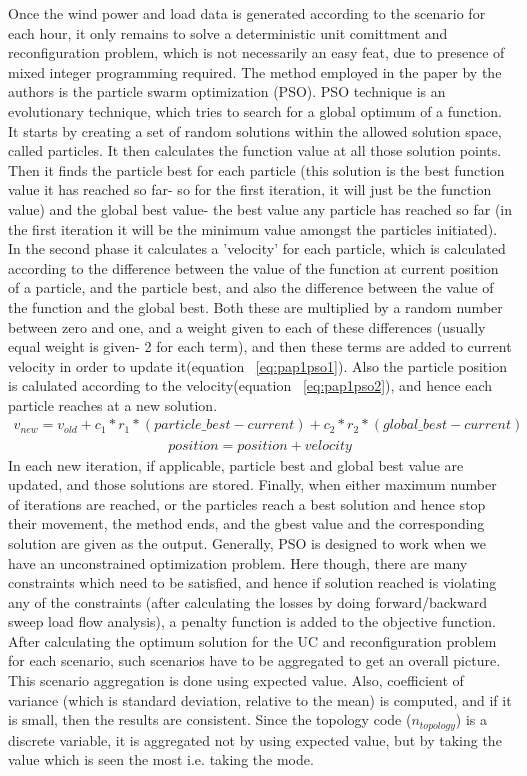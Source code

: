 Once the wind power and load data is generated according to the scenario for each hour, it only remains to solve a deterministic unit comittment and reconfiguration problem, which is not necessarily an easy feat, due to presence of mixed integer programming required. The method employed in the paper by the authors is the particle swarm optimization (PSO). PSO technique is an evolutionary technique, which tries to search for a global optimum of a function. It starts by creating a set of random solutions within the allowed solution space, called particles. It then calculates the function value at all those solution points. Then it finds the particle best for each particle (this solution is the best function value it has reached so far- so for the first iteration, it will just be the function value) and the global best value- the best value any particle has reached so far (in the first iteration it will be the minimum value amongst the particles initiated). In the second phase it calculates a 'velocity' for each particle, which is calculated according to the difference between the value of the function at current position of a particle, and the particle best, and also the difference between the value of the function and the global best. Both these are multiplied by a random number between zero and one, and a weight given to each of these differences (usually equal weight is given- 2 for each term), and then these terms are added to current velocity in order to update it(equation ~\eqref{eq:pap1pso1}). Also the particle position is calulated according to the velocity(equation ~\eqref{eq:pap1pso2}), and hence each particle reaches at a new solution.
\begin{eqnarray}
\label{eq:pap1pso1}
v_{new} = v_{old} + c_1*r_1*(particle\_best - current) + c_2*r_2*(global\_best - current)
\end{eqnarray}
\begin{eqnarray}
\label{eq:pap1pso2}
position = position + velocity
\end{eqnarray}
In each new iteration, if applicable, particle best and global best value are updated, and those solutions are stored. Finally, when either maximum number of iterations are reached, or the particles reach a best solution and hence stop their movement, the method ends, and the gbest value and the corresponding solution are given as the output.
Generally, PSO is designed to work when we have an unconstrained optimization problem. Here though, there are many constraints which need to be satisfied, and hence if solution reached is violating any of the constraints (after calculating the losses  by doing forward/backward sweep load flow analysis), a penalty function is added to the objective function.\\
After calculating the optimum solution for the UC and reconfiguration problem for each scenario, such scenarios have to be aggregated to get an overall picture. This scenario aggregation is done using expected value. Also, coefficient of variance (which is standard deviation, relative to the mean) is computed, and if it is small, then the results are consistent. Since the topology code ($n_{topology}$) is a discrete variable, it is aggregated not by using expected value, but by taking the value which is seen the most i.e. taking the mode.
